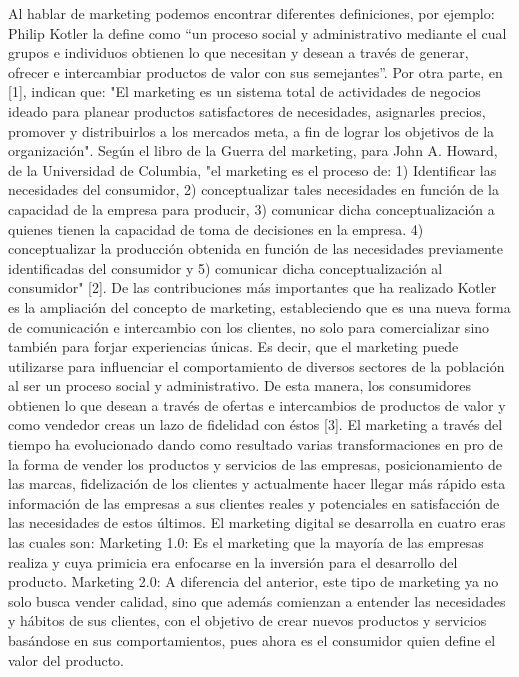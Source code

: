 \documentclass[12pt]{difu100cia} %
\begin{document}
Al hablar de marketing podemos encontrar diferentes definiciones, por ejemplo: Philip Kotler la define como “un proceso social y administrativo mediante el cual grupos e individuos obtienen lo que necesitan y desean a través de generar, ofrecer e intercambiar productos de valor con sus semejantes”.
Por otra parte, en [1], indican que: "El marketing es un sistema total de actividades de negocios ideado para planear productos satisfactores de necesidades, asignarles precios, promover y distribuirlos a los mercados meta, a fin de lograr los objetivos de la organización".
Según el libro de la Guerra del marketing, para John A. Howard, de la Universidad de Columbia, "el marketing es el proceso de: 1) Identificar las necesidades del consumidor, 2) conceptualizar tales necesidades en función de la capacidad de la empresa para producir, 3) comunicar dicha conceptualización a quienes tienen la capacidad de toma de decisiones en la empresa. 4) conceptualizar la producción obtenida en función de las necesidades previamente identificadas del consumidor y 5) comunicar dicha conceptualización al consumidor" [2].
De las contribuciones más importantes que ha realizado Kotler es la ampliación del concepto de marketing, estableciendo que es una nueva forma de comunicación e intercambio con los clientes, no solo para comercializar sino también para forjar experiencias únicas. Es decir, que el marketing puede utilizarse para influenciar el comportamiento de diversos sectores de la población al ser un proceso social y administrativo. De esta manera, los consumidores obtienen lo que desean a través de ofertas e intercambios de productos de valor y como vendedor creas un lazo de fidelidad con éstos [3].  
El marketing a través del tiempo ha evolucionado dando como resultado varias transformaciones en pro de la forma de vender los productos y servicios de las empresas, posicionamiento de las marcas, fidelización de los clientes y actualmente hacer llegar más rápido esta información de las empresas a sus clientes reales y potenciales en satisfacción de las necesidades de estos últimos.
El marketing digital se desarrolla en cuatro eras las cuales son:
Marketing 1.0: Es el marketing que la mayoría de las empresas realiza y cuya primicia era enfocarse en la inversión para el desarrollo del producto. 
Marketing 2.0: A diferencia del anterior, este tipo de marketing ya no solo busca vender calidad, sino que además comienzan a entender las necesidades y hábitos de sus clientes, con el objetivo de crear nuevos productos y servicios basándose en sus comportamientos, pues ahora es el consumidor quien define el valor del producto. 
\end{document}
